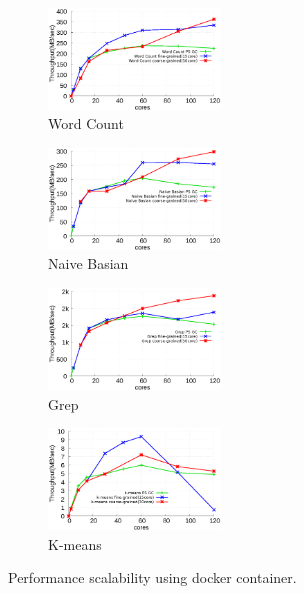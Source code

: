 \begin{figure}[tb]
    \centering
    \begin{subfigure}[b]{0.25\textwidth}
        \includegraphics[width=1.8in]{graph/wc_docker.eps}
        \caption{Word Count}
    \end{subfigure}%
    \begin{subfigure}[b]{0.25\textwidth}
        \includegraphics[width=1.8in]{graph/nb_docker.eps}
        \caption{Naive Basian}
    \end{subfigure}%
    \begin{subfigure}[b]{0.25\textwidth}
        \includegraphics[width=1.8in]{graph/grep_docker.eps}
        \caption{Grep}
    \end{subfigure}%
    \begin{subfigure}[b]{0.25\textwidth}
        \includegraphics[width=1.8in]{graph/kmeans_docker.eps}
        \caption{K-means}
    \end{subfigure}%
    \caption{Performance scalability using docker container.}
    \label{fig:docker}
\end{figure}


